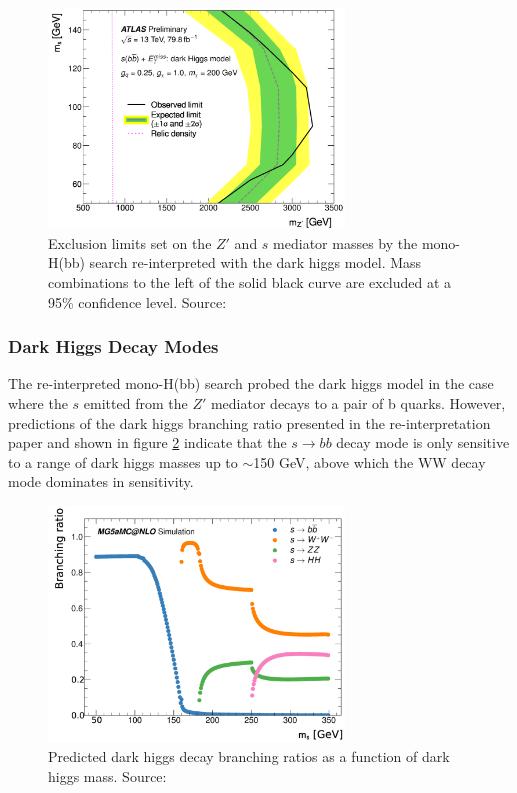 \documentclass[12pt]{article}
\begin{document}
\begin{figure}[H]
	\centering
	\includegraphics[width=0.7\textwidth]{figures/monosbb_exclusion.png}
	\caption[]{Exclusion limits set on the $Z'$ and $s$ mediator masses by the mono-H(bb) search re-interpreted with the dark higgs model. Mass combinations to the left of the solid black curve are excluded at a 95\% confidence level. Source: \cite{monohbb_recast}}
	\label{fig:monosbb_exclusion}
\end{figure}


\subsubsection{Dark Higgs Decay Modes}

The re-interpreted mono-H(bb) search probed the dark higgs model in the case where the $s$ emitted from the $Z'$ mediator decays to a pair of b quarks. However, predictions of the dark higgs branching ratio presented in the re-interpretation paper \cite{monohbb_recast} and shown in figure \ref{fig:higgsbrs} indicate that the $s \rightarrow bb$ decay mode is only sensitive to a range of dark higgs masses up to $\sim$150 GeV, above which the WW decay mode dominates in sensitivity. 

\begin{figure}[H]
	\centering
	\includegraphics[width=0.7\textwidth]{figures/BR_vs_mass.png}
	\caption[]{Predicted dark higgs decay branching ratios as a function of dark higgs mass. Source: \cite{monohbb_recast} }
	\label{fig:higgsbrs}
\end{figure}
\end{document}
